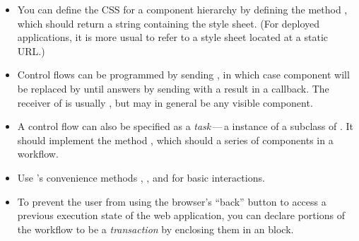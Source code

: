 \documentclass[a4paper,10pt,twoside]{book}
\begin{document}
\begin{itemize}
  \item You can define the CSS for a component hierarchy by defining the method , which should return a string containing the style sheet.
  (For deployed applications, it is more usual to refer to a style sheet located at a static URL.)
  \item Control flows can be programmed by sending , in which case component  will be replaced by  until  answers by sending  with a result in a callback.
  The receiver of  is usually , but may in general be any visible component.
  \item A control flow can also be specified as a \emph{task}\,---\,a instance of a subclass of . It should implement the method , which should  a series of components in a workflow.
  \item Use 's convenience methods , ,  and  for basic interactions.
  \item To prevent the user from using the browser's ``back'' button to access a previous execution state of the web application, you can declare portions of the workflow to be a \emph{transaction} by enclosing them in an  block.
\end{itemize}

\ifx\wholebook\relax\else 
   
   
\end{document}

